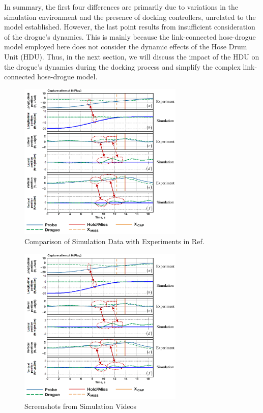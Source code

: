 In summary, the first four differences are primarily due to variations in the simulation environment and the presence of docking controllers, unrelated to the model established. However, the last point results from insufficient consideration of the drogue's dynamics. This is mainly because the link-connected hose-drogue model employed here does not consider the dynamic effects of the Hose Drum Unit (HDU). Thus, in the next section, we will discuss the impact of the HDU on the drogue's dynamics during the docking process and simplify the complex link-connected hose-drogue model.
\begin{figure}[htbp]
	\centering
	\includegraphics[width=0.7\textwidth]{Figures/Figs_Ch4/fig23.pdf}
	\caption{Comparison of Simulation Data with Experiments in Ref. \cite{dibley_autonomous_2007}}\label{fig4.20}
\end{figure}
\begin{figure}[htbp]
	\centering
	\includegraphics[width=0.7\textwidth]{Figures/Figs_Ch4/fig23.pdf}
	\caption{Screenshots from Simulation Videos}\label{fig4.21}
\end{figure}
